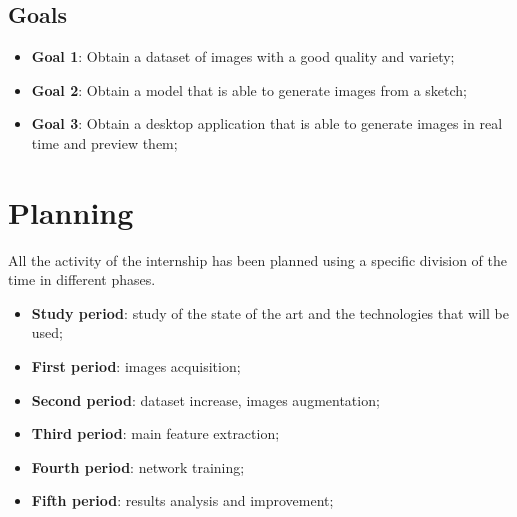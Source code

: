 \subsection{Goals}
\begin{itemize}
    \item \textbf{Goal 1}: Obtain a dataset of images with a good quality and variety;
    \item \textbf{Goal 2}: Obtain a model that is able to generate images from a sketch;
    \item \textbf{Goal 3}: Obtain a desktop application that is able to generate images in real time and preview them;
\end{itemize}
\section{Planning}
All the activity of the internship has been planned using a specific division of the time in different phases.\\
\begin{itemize}
    \item \textbf{Study period}: study of the state of the art and the technologies that will be used;
    \item \textbf{First period}: images acquisition;
    \item \textbf{Second period}: dataset increase, images augmentation;
    \item \textbf{Third period}: main feature extraction;
    \item \textbf{Fourth period}: network training;
    \item \textbf{Fifth period}: results analysis and improvement;
\end{itemize}

